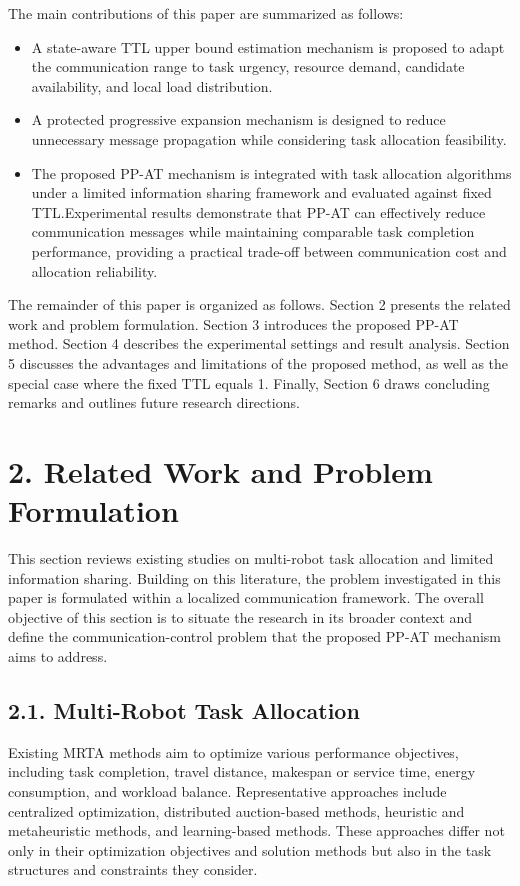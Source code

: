 \documentclass[type=submission,name=IR]{oae}
\begin{document}
The main contributions of this paper are summarized as follows:

\begin{itemize}
	\item A state-aware TTL upper bound estimation mechanism is proposed to adapt the communication range to task urgency, resource demand, candidate availability, and local load distribution.
	\item A protected progressive expansion mechanism is designed to reduce unnecessary message propagation while considering task allocation feasibility.
	\item The proposed PP-AT mechanism is integrated with task allocation algorithms under a limited information sharing framework and evaluated against fixed TTL.Experimental results demonstrate that PP-AT can effectively  reduce communication messages while maintaining comparable task completion performance, providing a practical trade-off between communication cost and allocation reliability.
\end{itemize}

The remainder of this paper is organized as follows. Section 2 presents the related work and problem formulation. Section 3 introduces the proposed PP-AT method. Section 4 describes the experimental settings and result analysis. Section 5 discusses the advantages and limitations of the proposed method, as well as the special case where the fixed TTL equals 1. Finally, Section 6 draws concluding remarks and outlines future research directions.



\section{2. Related Work and Problem Formulation}

This section reviews existing studies on multi-robot task allocation and limited information sharing. Building on this literature, the problem investigated in this paper is formulated within a localized communication framework. The overall objective of this section is to situate the research in its broader context and define the communication-control problem that the proposed PP-AT mechanism aims to address.

\subsection{2.1. Multi-Robot Task Allocation}

Existing MRTA methods aim to optimize various performance objectives, including task completion, travel distance, makespan or service time, energy consumption, and workload balance. Representative approaches include centralized optimization, distributed auction-based methods, heuristic and metaheuristic methods, and learning-based methods. These approaches differ not only in their optimization objectives and solution methods but also in the task structures and constraints they consider.
\end{document}
